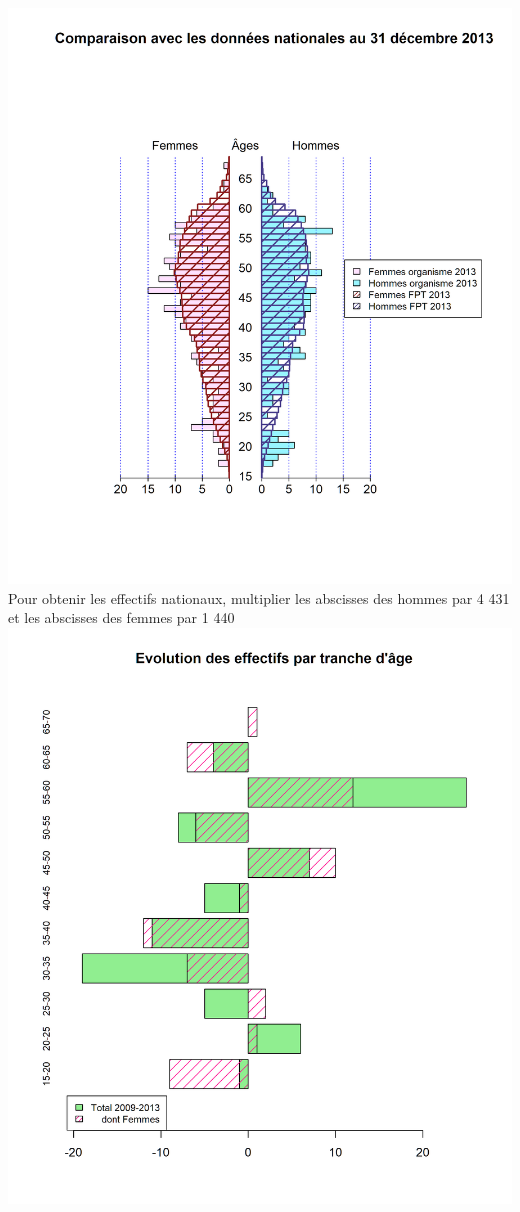 \includegraphics{altair_files/figure-latex/unnamed-chunk-11-2.png} Pour
obtenir les effectifs nationaux, multiplier les abscisses des hommes par
4 431 et les abscisses des femmes par 1 440\newpage
\includegraphics{altair_files/figure-latex/unnamed-chunk-11-3.png}

